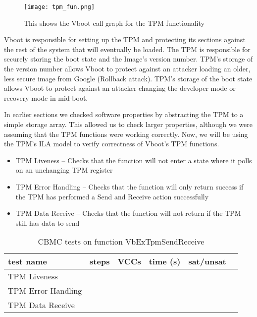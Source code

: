 \begin{figure}[!htbp]
  \centering
  \texttt{[image: tpm\_fun.png]}
  \caption[TPM Call Graph]{This shows the Vboot call graph for the TPM functionality}\label{fig:tpm_call_graph}
\end{figure}

Vboot is responsible for setting up the TPM and protecting its
sections against the rest of the system that will eventually be loaded.
The TPM is responsible for securely storing the boot state and the
Image's version number.
TPM's storage of the version number allows Vboot to protect against 
an attacker loading an older, less secure image from Google (Rollback attack).
TPM's storage of the boot state allows Vboot to protect against an attacker 
changing the developer mode or recovery mode in mid-boot.

In earlier sections we checked software properties by abstracting the TPM to a simple storage array. 
This allowed us to check larger properties, although we were assuming that the TPM functions were working correctly.
Now, we will be using the TPM's ILA model to verify correctness of Vboot's TPM functions.

\begin{itemize}
   \item TPM Liveness -- Checks that the function will not enter a state where it polls on an unchanging TPM register
   \item TPM Error Handling -- Checks that the function will only return success if the TPM has performed a Send and Receive action successfully
   \item TPM Data Receive -- Checks that the function will not return if the TPM still has data to send 
\end{itemize}

\begin{table}[!htbp]
    \centering
    \caption{CBMC tests on function VbExTpmSendReceive}\label{tpmSR_results}
    \begin{tabular}{llllll}
        \toprule
        test name & steps & VCCs & time (s) & sat/unsat  \\ \bottomrule
        TPM Liveness & & & & \\
        TPM Error Handling &  &  & & \\
        TPM Data Receive &  &  & & \\\bottomrule
    \end{tabular}
\end{table}

